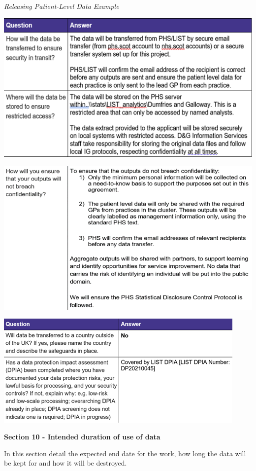 \documentclass[
]{book}
\begin{document}
\emph{Releasing Patient-Level Data Example}

\includegraphics[width=1\linewidth]{imgs/drl-patientlevel-1}

\includegraphics[width=1\linewidth]{imgs/drl-patientlevel-2}

\includegraphics[width=1\linewidth]{imgs/drl-patientlevel-3}

\textbf{Section 10 - Intended duration of use of data}

In this section detail the expected end date for the work, how long the data will be kept for and how it will be destroyed.
\end{document}
